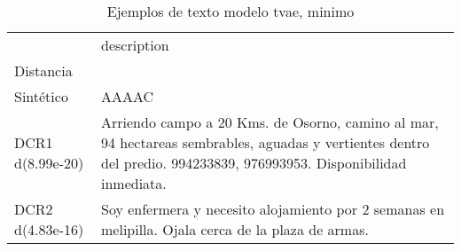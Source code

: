 \begin{table}[H]
\centering
\fontsize{10}{14}\selectfont
\caption{Ejemplos de texto modelo tvae, minimo}
\label{table-example-economicos-b-2-tvae-min-text}
\begin{tabular}{|l|m{35em}|}
\hline
\rowcolor[gray]{0.8}
 & description \\
Distancia &  \\
\hline Sintético & AAAAC \\
\hline DCR1 d(8.99e-20) & Arriendo campo a 20 Kms. de Osorno, camino al mar, 94 hectareas sembrables, aguadas y vertientes dentro del predio. 994233839, 976993953. Disponibilidad inmediata. \\
\hline DCR2 d(4.83e-16) & Soy enfermera y necesito alojamiento por 2 semanas en melipilla. Ojala cerca de la plaza de armas. \\
\hline
\end{tabular}
\end{table}
